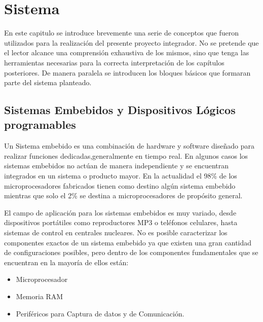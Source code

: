 \chapter{Sistema}
En este capitulo se introduce brevemente una serie de conceptos que fueron utilizados para la realización del presente proyecto integrador. No se pretende que el lector alcance una comprensión exhaustiva de los mismos, sino que tenga las herramientas necesarias para la correcta interpretación de los capítulos posteriores. De manera paralela se introducen los bloques básicos que formaran parte del sistema planteado.

\section{Sistemas Embebidos y Dispositivos Lógicos programables}

Un Sistema embebido es una combinación de hardware y software diseñado para realizar funciones dedicadas,generalmente en tiempo real. En algunos casos los sistemas embebidos no actúan de manera independiente y se encuentran integrados en un sistema o producto mayor.
En la actualidad el 98\% de los microprocesadores fabricados tienen como destino algún sistema embebido mientras que solo el 2\% se destina a microprocesadores de propósito general.

El campo de aplicación para los sistemas embebidos es muy variado, desde dispositivos portátiles como reproductores MP3 o teléfonos celulares, hasta sistemas de control en centrales nucleares.
No es posible caracterizar los componentes exactos de un sistema embebido ya que existen una gran cantidad de configuraciones posibles, pero dentro de los componentes fundamentales que se encuentran en la mayoría de ellos están:

\begin{itemize}
\item Microprocesador
\item Memoria RAM 
\item Periféricos para Captura de datos y de Comunicación.
\end{itemize}

